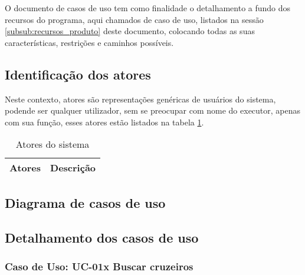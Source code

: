 
O documento de casos de uso tem como finalidade o detalhamento a fundo dos recursos do programa, aqui chamados de caso de uso, listados na sessão \ref{subsub:recursos_produto} deste documento, colocando todas as suas características, restrições e caminhos possíveis.

\subsection{Identificação dos atores}

Neste contexto, atores são representações genéricas de usuários do sistema, podende ser qualquer utilizador, sem se preocupar com nome do executor, apenas com sua função, esses atores estão listados na tabela \ref{tab:atores}.

\begin{table}[H]
\centering
\begin{tabular}{|p{2cm}|p{5cm}|}

\hline
\textbf{Atores} &
\textbf{Descrição}
\\
\hline


\end{tabular}
\caption{Atores do sistema}
\label{tab:atores}
\end{table}

\subsection{Diagrama de casos de uso}

\subsection{Detalhamento dos casos de uso}


\subsubsection{Caso de Uso: UC-01x Buscar cruzeiros}
